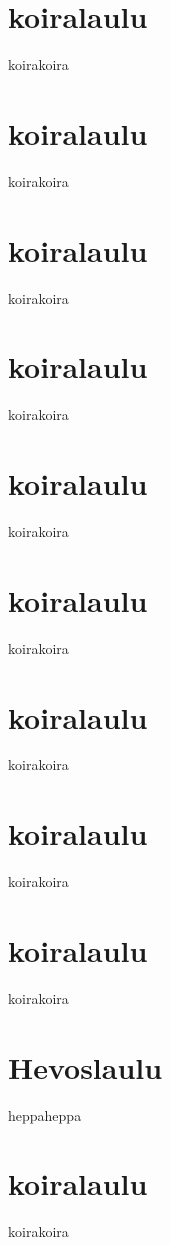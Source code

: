
\chapter{koiralaulu}
koirakoira
\chapter{koiralaulu}
koirakoira
\chapter{koiralaulu}
koirakoira
\chapter{koiralaulu}
koirakoira
\chapter{koiralaulu}
koirakoira







\chapter{koiralaulu}
koirakoira
\chapter{koiralaulu}
koirakoira
\chapter{koiralaulu}
koirakoira
\chapter{koiralaulu}
koirakoira
\chapter{Hevoslaulu}
heppaheppa
\chapter{koiralaulu}
koirakoira